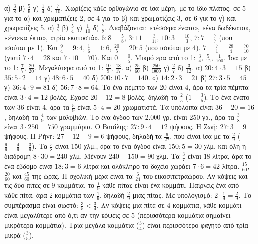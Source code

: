  α) $\frac{3}{8}$ \quad β) $\frac{5}{6}$ \quad γ) $\frac{1}{4}$ \quad δ) $\frac{7}{10}$.
 Χωρίζεις κάθε ορθογώνιο σε ίσα μέρη, με το ίδιο πλάτος: σε 5 για το α) και χρωματίζεις 2, σε 4 για το β) και χρωματίζεις 3, σε 6 για το γ) και χρωματίζεις 5.
 α) $\frac{3}{7}$ \quad β) $\frac{5}{4}$ \quad γ) $\frac{1}{10}$ \quad δ) $\frac{7}{9}$. Διαβάζονται: «τέσσερα ένατα», «ένα δωδέκατο», «έντεκα έκτα», «τρία εκατοστά».
 $5:8=\frac{5}{8}$, $3:11=\frac{3}{11}$, $10:3=\frac{10}{3}$, $7:7=\frac{7}{7}$ (που ισούται με 1). Και $\frac{9}{4}=9:4$, $\frac{1}{6}=1:6$, $\frac{20}{5}=20:5$ (που ισούται με 4).
 $7=\frac{7}{1}=\frac{28}{4}=\frac{70}{10}$ (γιατί $7\cdot 4=28$ και $7\cdot 10=70$). Και $0=\frac{0}{5}$.
 Μικρότερα από το 1: $\frac{3}{4}$, $\frac{5}{12}$, $\frac{1}{100}$. Ίσα με το 1: $\frac{7}{7}$, $\frac{20}{20}$. Μεγαλύτερα από το 1: $\frac{10}{9}$, $\frac{18}{17}$.
 α) $\frac{25}{60}$ \quad β) $\frac{250}{1000}$ \quad γ) $\frac{2}{7}$ \quad δ) $\frac{3}{12}$.
 α) $20:4\cdot 3=15$ \quad β) $35:5\cdot 2=14$ \quad γ) $48:6\cdot 5=40$ \quad δ) $200:10\cdot 7=140$.
 α) $14:2\cdot 3=21$ \quad β) $27:3\cdot 5=45$ \quad γ) $36:4\cdot 9=81$ \quad δ) $56:7\cdot 8=64$.
 Το ένα πέμπτο των 20 είναι 4, άρα τα τρία πέμπτα είναι $3\cdot 4=12$ βολές. Έχασε $20-12=8$ βολές, δηλαδή τα $\frac{2}{5}$ ($1-\frac{3}{5}$).
 Το ένα ένατο των 36 είναι 4, άρα τα $\frac{5}{9}$ είναι $5\cdot 4=20$ χρωματιστά. Τα υπόλοιπα είναι $36-20=16$, δηλαδή τα $\frac{4}{9}$ των μολυβιών.
 Το ένα όγδοο των 2.000 γρ. είναι 250 γρ., άρα τα $\frac{3}{8}$ είναι $3\cdot 250=750$ γραμμάρια.
 Ο Βασίλης: $27:9\cdot 4=12$ ψήφους. Η Ζωή: $27:3=9$ ψήφους. Η Ρήνη: $27-12-9=6$ ψήφους, δηλαδή τα $\frac{6}{27}$, που είναι ίσα με τα $\frac{2}{9}$ ($\frac{9}{9}-\frac{4}{9}-\frac{3}{9}$).
 Τα $\frac{5}{8}$ είναι 150 χλμ., άρα το ένα όγδοο είναι $150:5=30$ χλμ. και όλη η διαδρομή $8\cdot 30=240$ χλμ. Μένουν $240-150=90$ χλμ.
 Τα $\frac{3}{7}$ είναι 18 λίτρα, άρα το ένα έβδομο είναι $18:3=6$ λίτρα και ολόκληρο το δοχείο χωράει $7\cdot 6=42$ λίτρα.
 $\frac{15}{60}$, $\frac{20}{60}$ και $\frac{45}{60}$ της ώρας. Η σχολική μέρα είναι τα $\frac{6}{24}$ του εικοσιτετραώρου.
 Αν κόψεις και τις δύο πίτες σε 9 κομμάτια, το $\frac{1}{9}$ κάθε πίτας είναι ένα κομμάτι. Παίρνεις ένα από κάθε πίτα, άρα 2 κομμάτια των $\frac{1}{9}$, δηλαδή $\frac{2}{9}$ μιας πίτας. Με υπολογισμό: $2\cdot\frac{1}{9}=\frac{2}{9}$.
 Το συμπέρασμα είναι σωστό: $\frac{3}{5}<\frac{3}{4}$. Αν κόψεις μια πίτα σε 4 κομμάτια, κάθε κομμάτι είναι μεγαλύτερο από ό,τι αν την κόψεις σε 5 (περισσότερα κομμάτια σημαίνει μικρότερα κομμάτια). Τρία μεγάλα κομμάτια ($\frac{3}{4}$) είναι περισσότερο φαγητό από τρία μικρά ($\frac{3}{5}$).
